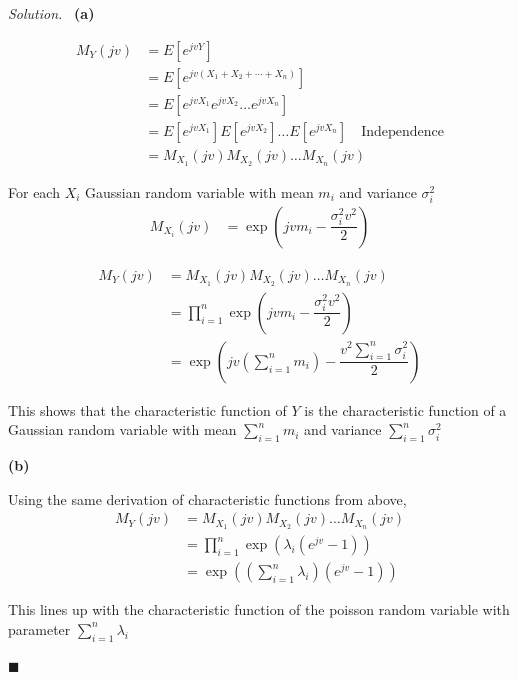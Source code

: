 \documentclass[11pt]{article}
\newenvironment{solution}
{\par\medskip\noindent\textit{Solution.}\ }
{\hfill$\blacksquare$\par\medskip}
\begin{document}
    \begin{solution}
        \textbf{(a)}

        \begin{align*}
            M_Y(jv) &= E[e^{jvY}] \\
            &= E[e^{jv(X_1 + X_2 + \cdots + X_n)}] \\
            &= E[e^{jvX_1}e^{jvX_2} \ldots e^{jvX_n}] \\
            &= E[e^{jvX_1}]E[e^{jvX_2}] \ldots E[e^{jvX_n}] \quad \text{Independence} \\
            &= M_{X_1}(jv)M_{X_2}(jv) \ldots M_{X_n}(jv)
        \end{align*}

        For each $X_i$ Gaussian random variable with mean $m_i$ and variance $\sigma_i^2$
        \begin{align*}
            M_{X_i}(jv) &= \exp\left(jv m_i - \dfrac{\sigma_{i}^{2}v^2}{2}\right)
        \end{align*}

        \begin{align*}
            M_Y(jv) &= M_{X_1}(jv)M_{X_2}(jv) \ldots M_{X_n}(jv) \\
            &= \prod_{i=1}^{n} \exp\left(jv m_i - \dfrac{\sigma_{i}^{2}v^2}{2}\right) \\
            &= \exp\left(jv (\sum_{i=1}^{n} m_i) - \dfrac{ v^2 \sum_{i=1}^{n} \sigma_{i}^{2} }{2}\right)
        \end{align*}

        This shows that the characteristic function of $Y$ is the characteristic function of a Gaussian random variable with mean $\sum_{i=1}^{n} m_i$ and variance $\sum_{i=1}^{n} \sigma_{i}^{2}$

        \vspace{1em}
        \textbf{(b)}

        Using the same derivation of characteristic functions from above,
        \begin{align*}
            M_Y(jv) &= M_{X_1}(jv)M_{X_2}(jv) \ldots M_{X_n}(jv) \\
            &= \prod_{i=1}^{n} \exp{\left( \lambda_i (e^{jv} - 1) \right)} \\
            &= \exp{\left( ( \sum_{i = 1}^{n} \lambda_i) (e^{jv} - 1) \right)}
        \end{align*}

        This lines up with the characteristic function of the poisson random variable with parameter $\sum_{i = 1}^{n} \lambda_i$


\end{solution}
\end{document}
